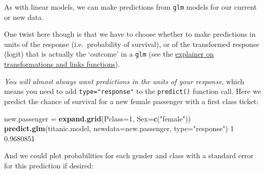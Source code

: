 \documentclass[]{article}
\newenvironment{Shaded}{\begin{snugshade}}{\end{snugshade}}
\newcommand{\DataTypeTok}[1]{\textcolor[rgb]{0.13,0.29,0.53}{#1}}
\newcommand{\DecValTok}[1]{\textcolor[rgb]{0.00,0.00,0.81}{#1}}
\newcommand{\FloatTok}[1]{\textcolor[rgb]{0.00,0.00,0.81}{#1}}
\newcommand{\KeywordTok}[1]{\textcolor[rgb]{0.13,0.29,0.53}{\textbf{#1}}}
\newcommand{\NormalTok}[1]{#1}
\newcommand{\StringTok}[1]{\textcolor[rgb]{0.31,0.60,0.02}{#1}}
\begin{document}
As with linear models, we can make predictions from \texttt{glm} models for our current
or new data.

One twist here though is that we have to choose whether to make predictions in
units of the response (i.e.~probability of survival), or of the transformed
response (logit) that is actually the `outcome' in a \texttt{glm} (see the
\protect\hyperlink{link-functions}{explainer on transformations and links functions}).

\emph{You will almost always want predictions in the units of your response}, which
means you need to add \texttt{type="response"} to the \texttt{predict()} function call. Here
we predict the chance of survival for a new female passenger with a first class
ticket:

\begin{Shaded}
\begin{Highlighting}[]
\NormalTok{new.passenger =}\StringTok{ }\KeywordTok{expand.grid}\NormalTok{(}\DataTypeTok{Pclass=}\DecValTok{1}\NormalTok{, }\DataTypeTok{Sex=}\KeywordTok{c}\NormalTok{(}\StringTok{"female"}\NormalTok{))}
\KeywordTok{predict.glm}\NormalTok{(titanic.model, }\DataTypeTok{newdata=}\NormalTok{new.passenger, }\DataTypeTok{type=}\StringTok{"response"}\NormalTok{)}
        \DecValTok{1} 
\FloatTok{0.9680851} 
\end{Highlighting}
\end{Shaded}

And we could plot probabilities for each gender and class with a standard error
for this prediction if desired:
\end{document}
